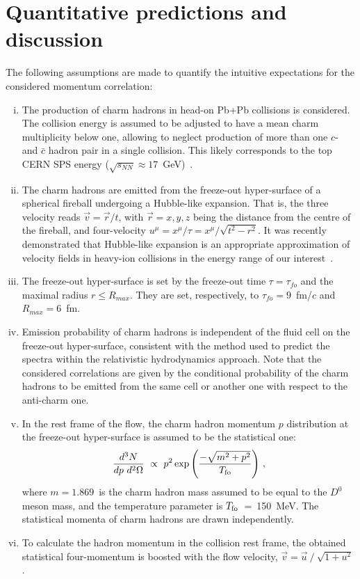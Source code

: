 \documentclass[floatfix,superscriptaddress,a4paper,
               showpieces,showkeys,nofootinbib,preprint]{revtex4-2}
\begin{document}
\section{Quantitative predictions and discussion}
\label{sec:model}

The following assumptions are made to quantify the intuitive expectations for the considered momentum correlation:

\begin{enumerate}[(i)]
\item
The production of charm  hadrons in head-on Pb+Pb collisions is considered.
The collision energy is assumed to be adjusted to have a mean charm multiplicity below one, allowing to neglect production of more than one $c$- and $\bar{c}$ hadron pair in a single collision. This likely corresponds to the top CERN SPS energy ($\sqrt{s_{NN}} \approx 17$~GeV)~\cite{Snoch:2018nnj}.

\item 
The charm hadrons are emitted from the freeze-out hyper-surface of a spherical fireball undergoing a Hubble-like expansion. That is, the three velocity reads $\vec{v} = \vec{r}/t $, with $\vec{r} = {x,y,z}$ being the distance from the centre of the fireball, and four-velocity $u^\mu =x^\mu/\tau=x^\mu/\sqrt{t^2-r^2}$. It was recently demonstrated that Hubble-like expansion is an appropriate approximation of velocity fields in heavy-ion collisions in the energy range of our interest~\cite{Tsegelnik:2022eoz}.

\item The freeze-out hyper-surface is set by the freeze-out time $\tau=\tau_{fo}$ and the maximal radius $r\le R_{max}$. They are set, respectively, to $\tau_{fo}=9$~fm/$c$ and $R_{max}= 6$~fm. 

\item Emission probability of charm hadrons is independent of the fluid cell on the freeze-out hyper-surface, consistent with the method used to predict the spectra within the relativistic hydrodynamics approach. Note that the considered correlations are given by the conditional probability of the charm hadrons to be emitted from the same cell or another one with respect to the anti-charm one.

\item
In the rest frame of the flow, the charm hadron momentum $p$ distribution at
the freeze-out hyper-surface is assumed to be the statistical one:
\begin{equation}
   \frac{d^3N} {dp~d^2\Omega} ~\propto~ p^2 \exp{ \left(  \frac{- \sqrt{m^2 + p^2} }{T_{\rm fo}} \right) }~,
\end{equation}
where $m = 1.869$~\GeVc is the charm hadron mass assumed to be equal to the $D^0$ meson mass, and the temperature parameter is $T_{\rm fo}$~=~150~MeV. 
The statistical momenta of charm hadrons are drawn independently.
\item
To calculate the hadron momentum in the collision rest frame, the obtained statistical four-momentum is boosted with the flow velocity, 
$\vec{v} =  \vec{u}~/~\sqrt{1+u^2}$.
\end{enumerate}
\end{document}
